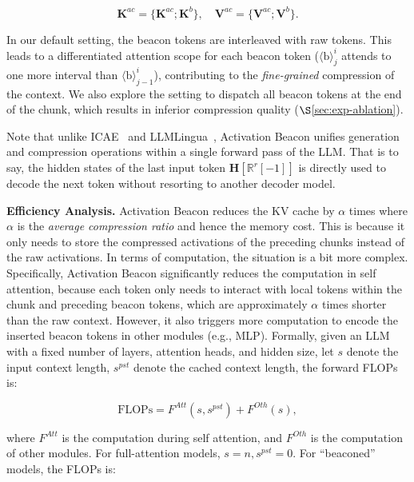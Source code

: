\begin{equation}
    \boldsymbol{K}^{ac} = \{\boldsymbol{K}^{ac}; \boldsymbol{K}^b\}, \quad \boldsymbol{V}^{ac} = \{\boldsymbol{V}^{ac}; \boldsymbol{V}^b\}.
\end{equation}

In our default setting, the beacon tokens are interleaved with raw tokens. This leads to a differentiated attention scope for each beacon token ($\langle\text{b}\rangle_{j}^i$ attends to one more interval than $\langle\text{b}\rangle_{j-1}^i$), contributing to the \textit{fine-grained} compression of the context. We also explore the setting to dispatch all beacon tokens at the end of the chunk, which results in inferior compression quality ($\S$\ref{sec:exp-ablation}).

Note that unlike ICAE~\citep{ge2024icae} and LLMLingua~\citep{jiang2023longllmlingua}, Activation Beacon unifies generation and compression operations within a single forward pass of the LLM. That is to say, the hidden states of the last input token $\boldsymbol{H}[\mathbb{R}^r[-1]]$ is directly used to decode the next token without resorting to another decoder model.

\textbf{Efficiency Analysis.} Activation Beacon reduces the KV cache by $\alpha$ times where $\alpha$ is the \textit{average compression ratio} and hence the memory cost. This is because it only needs to store the compressed activations of the preceding chunks instead of the raw activations. In terms of computation, the situation is a bit more complex. Specifically, Activation Beacon significantly reduces the computation in self attention, because each token only needs to interact with local tokens within the chunk and preceding beacon tokens, which are approximately $\alpha$ times shorter than the raw context. However, it also triggers more computation to encode the inserted beacon tokens in other modules (e.g., MLP). Formally, given an LLM with a fixed number of layers, attention heads, and hidden size, let $s$ denote the input context length, $s^{pst}$ denote the cached context length, the forward FLOPs is:

\begin{equation}
    \mathrm{FLOPs} = F^{Att}(s, s^{pst}) + F^{Oth}(s),
\end{equation}

where $F^{Att}$ is the computation during self attention, and $F^{Oth}$ is the computation of other modules. For full-attention models, $s=n, s^{pst}=0$. For ``beaconed'' models, the FLOPs is:

